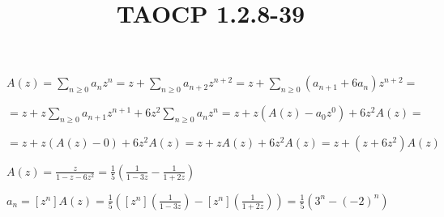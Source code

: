 \documentclass{article}
\title{TAOCP 1.2.8\mbox{-}39}
\begin{document}
\maketitle

\( A(z) = \sum_{n \geq 0} a_n z^n = z + \sum_{n \geq 0}a_{n+2}z^{n+2} = z + \sum_{n \geq 0} (a_{n+1} + 6a_{n})z^{n+2} = \)

\( = z + z\sum_{n \geq 0} a_{n+1}z^{n+1} + 6z^{2}\sum_{n \geq 0} a_{n}z^{n} = z + z(A(z) - a_{0}z^{0}) + 6z^{2}A(z) = \)

\( = z + z(A(z) - 0) + 6z^{2}A(z) = z + zA(z) + 6z^{2}A(z) = z + (z+6z^{2})A(z) \)

\( A(z) = \frac{z}{1-z-6z^{2}} = \frac{1}{5}(\frac{1}{1-3z} - \frac{1}{1+2z}) \)

\( a_{n} = [z^{n}]A(z) = \frac{1}{5}([z^{n}](\frac{1}{1-3z}) - [z^{n}](\frac{1}{1+2z})) = \frac{1}{5}(3^{n} - (-2)^{n}) \)
\end{document}
